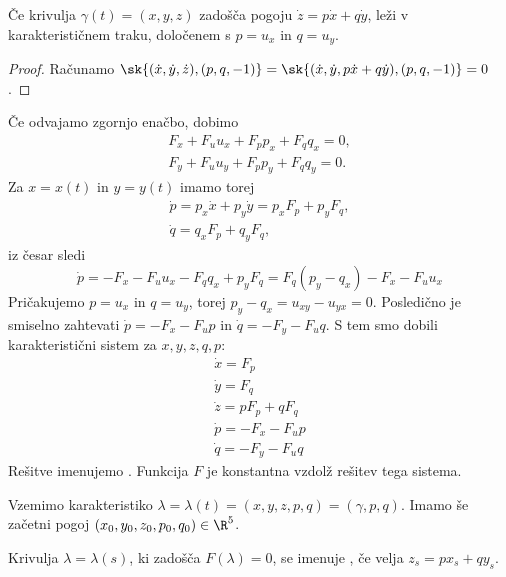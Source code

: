 \begin{trditev}
  Če krivulja $\gamma(t) = (x, y, z)$ zadošča pogoju $\dot{z} = p \dot{x} + q
  \dot{y}$, leži v karakterističnem traku, določenem s $p = u_x$ in $q = u_y$.
\end{trditev}

\begin{proof}
  Računamo $\sk{(\dot{x}, \dot{y}, \dot{z}), (p, q, -1)} = \sk{(\dot{x}, \dot{y},
  p \dot{x} + q \dot{y}), (p, q, -1)} = 0$.
\end{proof}

Če odvajamo zgornjo enačbo, dobimo
\begin{gather*}
  F_x + F_u u_x + F_p p_x + F_q q_x = 0, \\
  F_y + F_u u_y + F_p p_y + F_q q_y = 0.
\end{gather*}
Za $x = x(t)$ in $y = y(t)$ imamo torej
\begin{gather*}
  \dot{p} = p_x \dot{x} + p_y \dot{y} = p_x F_p + p_y F_q, \\
  \dot{q} = q_x F_p + q_y F_q,
\end{gather*}
iz česar sledi
\[
  \dot{p} = - F_x - F_u u_x - F_q q_x + p_y F_q
  = F_q (p_y - q_x) - F_x - F_u u_x
\]
Pričakujemo $p = u_x$ in $q = u_y$, torej $p_y - q_x = u_{xy} - u_{yx} = 0$.
Posledično je smiselno zahtevati $\dot{p} = -F_x - F_u p$ in $\dot{q} = -F_y -
F_u q$.
S tem smo dobili karakteristični sistem za $x, y, z, q, p$:
\begin{gather*}
  \dot{x} = F_p \\
  \dot{y} = F_q \\
  \dot{z} = p F_p + q F_q \\
  \dot{p} = - F_x - F_u p \\
  \dot{q} = - F_y - F_u q
\end{gather*}
Rešitve imenujemo .
Funkcija $F$ je konstantna vzdolž rešitev tega sistema.



Vzemimo karakteristiko $\lambda = \lambda(t) = (x, y, z, p, q) = (\gamma, p,
q)$.
Imamo še začetni pogoj $(x_0, y_0, z_0, p_0, q_0) \in \R^5$.

\begin{definicija}
  Krivulja $\lambda = \lambda(s)$, ki zadošča $F(\lambda) = 0$, se imenuje
  , če velja $z_s = p x_s + q y_s$.
\end{definicija}

